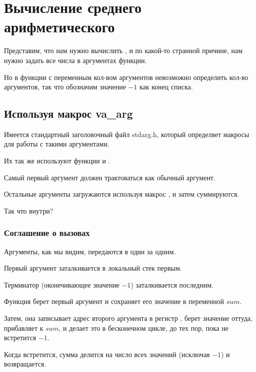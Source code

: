 \section{Вычисление среднего арифметического}

Представим, что нам нужно вычислить , 
и по какой-то странной причине, 
нам нужно задать все числа в аргументах функции.

Но в \CCpp функции с переменным кол-вом аргументов невозможно определить кол-во аргументов,
так что обозначим значение $-1$ как конец списка.%

\subsection{Используя макрос va\_arg}

Имеется стандартный заголовочный файл stdarg.h, который определяет макросы для работы с такими аргументами.

Их так же используют функции \printf и \scanf.



Самый первый аргумент должен трактоваться как обычный аргумент.

Остальные аргументы загружаются используя макрос , и затем суммируются.

Так что внутри?

\subsubsection{Соглашение о вызовах }



Аргументы, как мы видим, передаются в \main один за одним.

Первый аргумент заталкивается в локальный стек первым.

Терминатор (оконечивающее значение $-1$) заталкивается последним.

Функция  берет первый аргумент и сохраняет его значение в переменной $sum$.

Затем, она записывает адрес второго аргумента в регистр \EDX, берет значение оттуда, прибавляет к $sum$,
и делает это в бесконечном цикле, до тех пор, пока не встретится $-1$.

Когда встретится, сумма делится на число всех значений (исключая $-1$) и  
возвращается.

